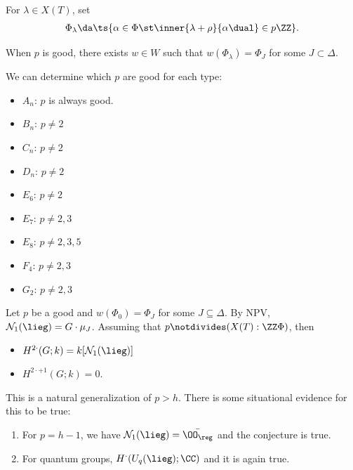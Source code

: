 For \(\lambda\in X(T)\), set
\begin{align*}  
\Phi_\lambda \da \ts{ \alpha\in\Phi \st \inner{\lambda+\rho}{\alpha\dual} \in p\ZZ }
.\end{align*}

When \(p\) is good, there exists \(w\in W\) such that
\(w(\Phi_\lambda) = \Phi_J\) for some \(J \subset\Delta\).


\begin{example}[?]

We can determine which \(p\) are good for each type:

\begin{itemize}
\tightlist
\item
  \(A_n\): \(p\) is always good.
\item
  \(B_n\): \(p\neq 2\)
\item
  \(C_n\): \(p\neq 2\)
\item
  \(D_n\): \(p\neq 2\)
\item
  \(E_6\): \(p\neq 2\)
\item
  \(E_7\): \(p\neq 2, 3\)
\item
  \(E_8\): \(p\neq 2, 3,5\)
\item
  \(F_4\): \(p\neq 2, 3\)
\item
  \(G_2\): \(p\neq 2, 3\)
\end{itemize}

\end{example}

\begin{conjecture}

Let \(p\) be a good and \(w(\Phi_0) = \Phi_J\) for some
\(J \subseteq \Delta\). By NPV,
\(\mathcal{N}_1(\lieg) = G \cdot \mu_J\). Assuming that
\(p\notdivides (X(T): \ZZ \Phi)\), then

\begin{itemize}
\tightlist
\item
  \(H^{2\cdot}(G; k) = k[\mathcal{N}_1(\lieg)]\)
\item
  \(H^{2\cdot + 1}(G; k) = 0\).
\end{itemize}

\end{conjecture}

\begin{remark}

This is a natural generalization of \(p>h\). There is some situational
evidence for this to be true:

\begin{enumerate}
\def\labelenumi{\arabic{enumi}.}
\tightlist
\item
  For \(p=h-1\), we have \(\mathcal{N}_1(\lieg) = \bar{\OO_{\reg}}\) and
  the conjecture is true.
\item
  For quantum groups, \(H^\cdot(U_q(\lieg); \CC )\) and it is again
  true.
\end{enumerate}


\end{remark}


